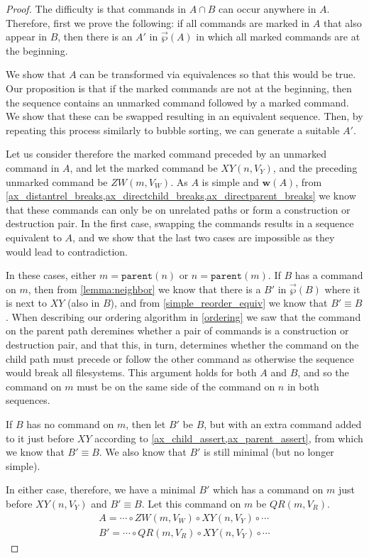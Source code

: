 \documentclass[12pt]{article}
\newcommand{\parent}{\mathtt{parent}}
\newcommand{\fscommand}[2]{{#1#2}}
\newcommand{\cxy}{\fscommand{X}{Y}}
\newcommand{\czw}{\fscommand{Z}{W}}
\newcommand{\cqr}{\fscommand{Q}{R}}
\newcommand{\cc}{\circ} %
\newcommand{\workssign}{\mathbf{w}}
\newcommand{\works}[1]{\workssign({#1})}
\newcommand{\orderset}[1]{\vec{\wp}({#1})}
\theoremstyle{definition}
\begin{document}
\begin{proof}
The difficulty is that commands in $A\cap B$ can occur anywhere in $A$.
Therefore, first we prove the following:
if all commands are marked in $A$ that also appear in $B$,
then there is an $A'$ in $\orderset{A}$ in which all marked commands are at the beginning.

We show that $A$ can be transformed via equivalences so that this would be true.
Our proposition is that if the marked commands are not at the beginning, then
the sequence contains an unmarked command followed by a marked command.
We show that these can be swapped resulting in an equivalent sequence.
Then, by repeating this process similarly to bubble sorting, we can generate 
a suitable $A'$.

\medskip

Let us consider therefore the marked command preceded by an unmarked command in $A$,
and let the marked command be $\cxy(n, V_Y)$, 
and the preceding unmarked command be $\czw(m, V_W)$.
As $A$ is simple and $\works{A}$, from 
\cref{ax_distantrel_breaks,ax_directchild_breaks,ax_directparent_breaks}
we know that these commands can only be on unrelated paths or form a construction or destruction pair.
In the first case, swapping the commands results in a sequence equivalent to $A$,
and we show that the last two cases are impossible as they would lead to contradiction.

In these cases, either $m=\parent(n)$ or $n=\parent(m)$.
If $B$ has a command on $m$, then
from \cref{lemma:neighbor}
we know that there is a $B'$ in $\orderset{B}$ where it is next to $\cxy$ (also in $B$),
and from \cref{simple_reorder_equiv} we know that $B'\equiv B$.
When describing our ordering algorithm in \cref{ordering} we saw
that the command on the parent path deremines whether a pair of commands
is a construction or destruction pair,
and that this, in turn, determines whether the command on the child path must
precede or follow the other command as otherwise the sequence would break all filesystems.
This argument holds for both $A$ and $B$, and so the command on $m$ must be on
the same side of the command on $n$ in both sequences.

If $B$ has no command on $m$, then let $B'$ be $B$, 
but with an extra command added to it just before $\cxy$
according to \cref{ax_child_assert,ax_parent_assert}, 
from which we know that $B'\equiv B$.
We also know that $B'$ is still minimal (but no longer simple).

In either case, therefore,
we have a minimal $B'$ which has a command on $m$ just before $\cxy(n, V_Y)$ and $B'\equiv B$.
Let this command on $m$ be $\cqr(m, V_R)$.
\begin{gather*}
A = \cdots\cc  \czw(m, V_W)\cc  \cxy(n, V_Y)\cc  \cdots \\
B' = \cdots\cc  \cqr(m, V_R)\cc  \cxy(n, V_Y)\cc  \cdots
\end{gather*}


\end{proof}
\end{document}
